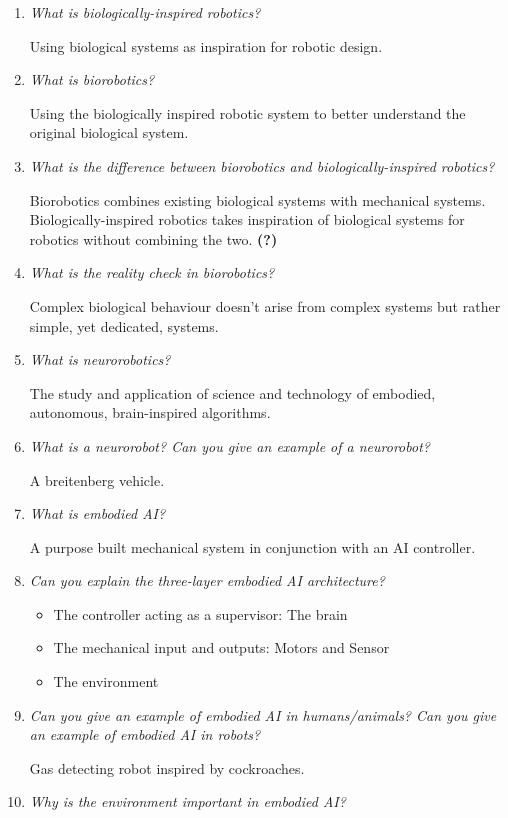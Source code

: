 \documentclass[
    fontsize      = 11pt,
    paper         = a4,
    twoside       = false,
    parskip       = half,
    pagesize      = false,
]{scrartcl}
\providecommand{\tightlist}{%
  \setlength{\itemsep}{0pt}\setlength{\parskip}{0pt}}
\begin{document}
\begin{enumerate}
\def\labelenumi{\arabic{enumi}.}
\item
  \emph{What is biologically-inspired robotics?}

  Using biological systems as inspiration for robotic design.
\item
  \emph{What is biorobotics?}

  Using the biologically inspired robotic system to better understand
  the original biological system.
\item
  \emph{What is the difference between biorobotics and
  biologically-inspired robotics?}

  Biorobotics combines existing biological systems with mechanical
  systems. Biologically-inspired robotics takes inspiration of
  biological systems for robotics without combining the two.
  \textbf{(?)}
\item
  \emph{What is the reality check in biorobotics?}

  Complex biological behaviour doesn't arise from complex systems but
  rather simple, yet dedicated, systems.
\item
  \emph{What is neurorobotics?}

  The study and application of science and technology of embodied,
  autonomous, brain-inspired algorithms.
\item
  \emph{What is a neurorobot? Can you give an example of a neurorobot?}

  A breitenberg vehicle.
\item
  \emph{What is embodied AI?}

  A purpose built mechanical system in conjunction with an AI
  controller.
\item
  \emph{Can you explain the three-layer embodied AI architecture?}

  \begin{itemize}
  \tightlist
  \item
    The controller acting as a supervisor: The brain
  \item
    The mechanical input and outputs: Motors and Sensor
  \item
    The environment
  \end{itemize}
\item
  \emph{Can you give an example of embodied AI in humans/animals? Can
  you give an example of embodied AI in robots?}

  Gas detecting robot inspired by cockroaches.
\item
  \emph{Why is the environment important in embodied AI?}


\end{enumerate}
\end{document}
